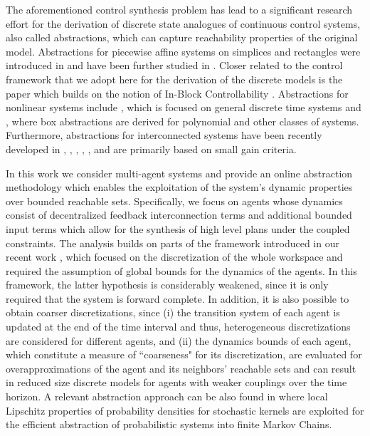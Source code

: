 \documentclass[reqno]{amsart}
\theoremstyle{plain}
\theoremstyle{definition}
\numberwithin{equation}{section}
\begin{document}
The aforementioned control synthesis problem has lead to a significant  research effort for the derivation of discrete state analogues of  continuous control systems, also called abstractions, which can capture reachability properties of the original model. Abstractions for piecewise affine systems on simplices and rectangles were introduced in  \cite{HlVj01} and have been further studied in \cite{BmGm14}. Closer related to the control framework that we adopt here for the derivation of the discrete models is the paper \cite{HmCp14b} which builds on the notion of In-Block Controllability \cite{CpWy95}. Abstractions for nonlinear systems include \cite{Rg11}, which is focused on general discrete time systems and \cite{AaTaSa09}, where box abstractions are derived for polynomial and other classes of systems. Furthermore, abstractions for interconnected systems have been recently developed in \cite{TyIj08}, \cite{PgPpDm14},  \cite{PgPpDm16}, \cite{RmZm15}, \cite{Mp15a}, \cite{DeTp15} and are primarily based on small gain criteria. 

In this work we consider multi-agent systems and provide an online abstraction methodology which enables the exploitation of the system's dynamic properties over bounded reachable sets. Specifically, we focus on agents whose dynamics consist of decentralized feedback interconnection terms and additional bounded input terms which allow for the synthesis of high level plans under the coupled constraints. The analysis builds on parts of the framework introduced in our recent work \cite{BdDd15a}, which focused on the discretization of the whole workspace and required the assumption of global bounds for the dynamics of the agents. In this framework, the latter hypothesis is considerably weakened, since it is only required that the system is forward complete. In addition, it is also possible to obtain coarser discretizations, since (i) the transition system of each agent is updated at the end of the time interval and thus, heterogeneous discretizations are considered for different agents, and  (ii) the dynamics bounds of each agent, which constitute a measure of ``coarseness" for its discretization, are evaluated for overapproximations of the agent and its neighbors' reachable sets and can result in reduced size discrete models for agents with weaker couplings over the time horizon. A relevant abstraction approach can be also found in \cite{SeAa13} where local Lipschitz properties of probability densities for stochastic kernels are exploited for the efficient abstraction of probabilistic systems into finite Markov Chains.   
  
\end{document}
